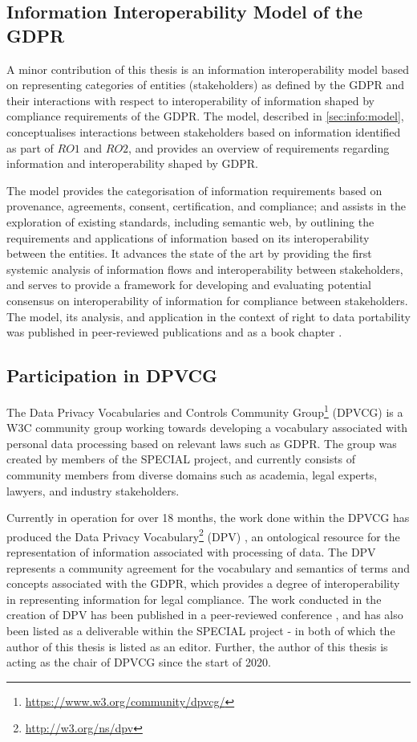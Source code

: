 \subsection{Information Interoperability Model of the GDPR}
A minor contribution of this thesis is an information interoperability model based on representing categories of entities (stakeholders) as defined by the GDPR and their interactions with respect to interoperability of information shaped by compliance requirements of the GDPR.
The model, described in \autoref{sec:info:model}, conceptualises interactions between stakeholders based on information identified as part of $RO1$ and $RO2$, and provides an overview of requirements regarding information and interoperability shaped by GDPR.

The model provides the categorisation of information requirements based on provenance, agreements, consent, certification, and compliance; and assists in the exploration of existing standards, including semantic web, by outlining the requirements and applications of information based on its interoperability between the entities.
It advances the state of the art by providing the first systemic analysis of information flows and interoperability between stakeholders, and serves to provide a framework for developing and evaluating potential consensus on interoperability of information for compliance between stakeholders.
The model, its analysis, and application in the context of right to data portability was published in peer-reviewed publications \cite{pandit_modelling_2017,pandit_exploration_2018} and as a book chapter \cite{} .

\subsection{Participation in DPVCG}\label{sec:intro:dpvcg}
The Data Privacy Vocabularies and Controls Community Group\footnote{\url{https://www.w3.org/community/dpvcg/}} (DPVCG) is a W3C community group working towards developing a vocabulary associated with personal data processing based on relevant laws such as GDPR.
The group was created by members of the SPECIAL project, and currently consists of community members from diverse domains such as academia, legal experts, lawyers, and industry stakeholders.

Currently in operation for over 18 months, the work done within the DPVCG has produced the Data Privacy Vocabulary\footnote{\url{http://w3.org/ns/dpv}} (DPV) , an ontological resource for the representation of information associated with processing of data.
The DPV represents a community agreement for the vocabulary and semantics of terms and concepts associated with the GDPR, which provides a degree of interoperability in representing information for legal compliance.
The work conducted in the creation of DPV has been published in a peer-reviewed conference \cite{pandit_dpv_2019}, and has also been listed as a deliverable within the SPECIAL project \cite{pandit_d6.5_2019} - in both of which the author of this thesis is listed as an editor.
Further, the author of this thesis is acting as the chair of DPVCG since the start of 2020.


